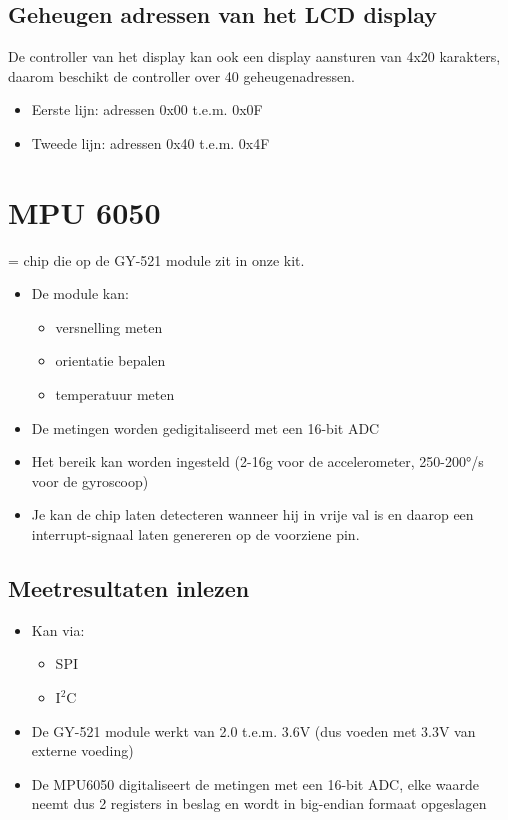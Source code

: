 \documentclass{article}
\begin{document}
\subsection{Geheugen adressen van het LCD display}
De controller van het display kan ook een display aansturen van 4x20 karakters, 
daarom beschikt de controller over 40 geheugenadressen. 

\begin{itemize}
    \item Eerste lijn: adressen 0x00 t.e.m. 0x0F
    \item Tweede lijn: adressen 0x40 t.e.m. 0x4F
\end{itemize}

\section{MPU 6050}

= chip die op de GY-521 module zit in onze kit. 

\begin{itemize}
    \item De module kan:
    \begin{itemize}
        \item versnelling meten
        \item orientatie bepalen
        \item temperatuur meten
    \end{itemize}
    \item De metingen worden gedigitaliseerd met een 16-bit ADC 
    \item Het bereik kan worden ingesteld (2-16g voor de accelerometer, 250-200°/s voor de gyroscoop)
    \item Je kan de chip laten detecteren wanneer hij in vrije val is en daarop een interrupt-signaal laten genereren op de voorziene pin.
\end{itemize}

\subsection{Meetresultaten inlezen}

\begin{itemize}
    \item Kan via:
    \begin{itemize}
        \item SPI
        \item $\text{I}^2\text{C}$
    \end{itemize}
    \item De GY-521 module werkt van 2.0 t.e.m. 3.6V (dus voeden met 3.3V van externe voeding)
    \item De MPU6050 digitaliseert de metingen met een 16-bit ADC, elke waarde neemt dus 2 registers in beslag en wordt in big-endian formaat opgeslagen
\end{itemize}
\end{document}
